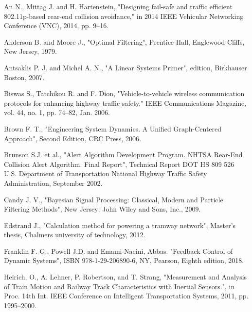 \begin{thebibliography}{}

\newblock An N., Mittag J. and H. Hartenstein, 
\newblock "Designing fail-safe and traffic efficient 802.11p-based rear-end collision avoidance," in 2014 IEEE Vehicular Networking Conference (VNC), 2014, pp. 9–16.

\newblock Anderson B. and Moore J.,
\newblock "Optimal Filtering",
\newblock Prentice-Hall, Englewood Cliffs, New Jersey, 1979.

\newblock Antsaklis P. J. and Michel A. N.,
\newblock "A Linear Systems Primer",
 edition, Birkhauser Boston, 2007.
 

\newblock Biswas S., Tatchikou R. and F. Dion, 
\newblock "Vehicle-to-vehicle wireless communication protocols for enhancing highway traffic safety,"
\newblock IEEE Communications Magazine, vol. 44, no. 1, pp. 74–82, Jan. 2006.

\newblock Brown F. T.,
\newblock "Engineering System Dynamics. A Unified Graph-Centered Approach",
\newblock Second Edition, CRC Press, 2006. 

\newblock Brunson S.J. et al., 
\newblock "Alert Algorithm Development Program. NHTSA Rear-End Collision Alert Algorithm. Final Report", 
\newblock Technical Report DOT HS 809 526 U.S. Department of Transportation National Highway Traffic Safety Administration, September 2002.

\newblock Candy J. V.,
\newblock "Bayesian Signal Processing: Classical, Modern and Particle Filtering Methods", 
\newblock New Jersey: John Wiley and Sons, Inc., 2009.

\newblock Edstrand J.,
\newblock "Calculation method for powering a tramway network",
\newblock Master's thesis, Chalmers university of technology, 2012.

\newblock Franklin F. G., Powell J.D. and Emami-Naeini, Abbas.
\newblock "Feedback Control of Dynamic Systems", 
\newblock ISBN 978-1-29-206890-6, NY, Pearson, Eighth edition, 2018.

\newblock Heirich, O., A. Lehner, P. Robertson, and T. Strang,
\newblock "Measurement and Analysis of Train Motion and Railway Track Characteristics with Inertial Sensors.",
\newblock in Proc. 14th Int. IEEE Conference on Intelligent Transportation Systems, 2011, pp. 1995–2000.


\end{thebibliography}
